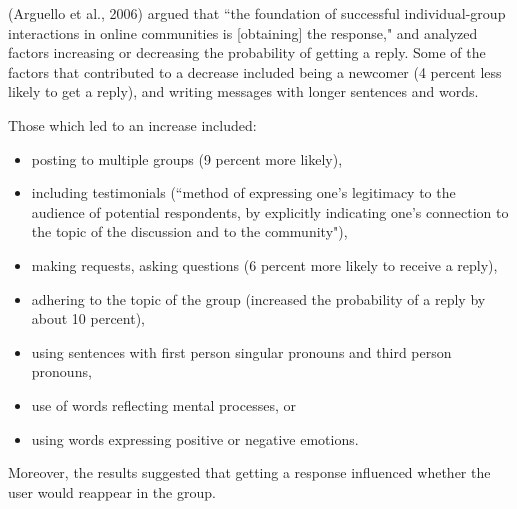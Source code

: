 \documentclass[
  10pt,
  dvipsnames]{scrartcl}
\begin{document}
(Arguello et al., 2006) argued that ``the foundation of successful
individual-group interactions in online communities is {[}obtaining{]}
the response," and analyzed factors increasing or decreasing the
probability of getting a reply. Some of the factors that contributed to
a decrease included being a newcomer (4 percent less likely to get a
reply), and writing messages with longer sentences and words.

Those which led to an increase included:

\begin{itemize}
    \item posting to multiple groups (9 percent more likely), 
    \item including testimonials (``method of expressing one's legitimacy to the audience of potential respondents, by explicitly indicating one's connection to the topic of the discussion and to the community"), 
    \item making requests, asking questions (6 percent more likely to receive a reply),
    \item adhering to the topic of the group (increased the probability of a reply by about 10 percent),
    \item using sentences with first person singular pronouns and third person pronouns,
    \item use of words reflecting mental processes, or
    \item using words expressing positive or negative emotions.
\end{itemize}

Moreover, the results suggested that getting a response influenced
whether the user would reappear in the group.
\end{document}
